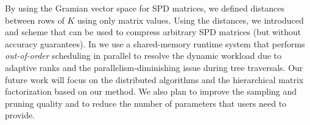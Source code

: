 By using the Gramian vector space for SPD matrices, we defined distances between rows of $K$ using only  matrix
values. Using the distances, we introduced \gofmm{} and \hmatrix{} scheme that
can be used to compress arbitrary  SPD matrices (but without accuracy
    guarantees).  In \gofmm{} we use a shared-memory runtime system that
performs \emph{out-of-order} scheduling in parallel to resolve the dynamic
workload due to  
adaptive ranks and the parallelism-diminishing issue during tree traversals.
Our future work will focus on the distributed algorithms and the hierarchical matrix factorization based on our method. 
We also plan to improve the sampling and pruning quality and to reduce the
number of parameters that users need to provide.

